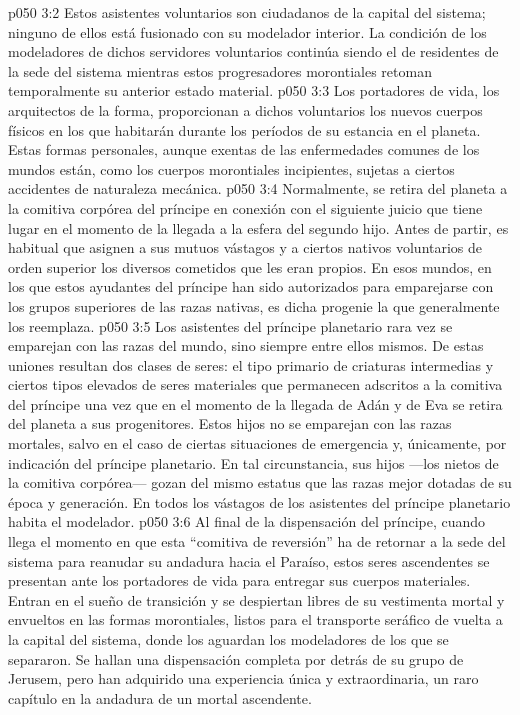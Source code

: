 \vs p050 3:2 \pc Estos asistentes voluntarios son ciudadanos de la capital del sistema; ninguno de ellos está fusionado con su modelador interior. La condición de los modeladores de dichos servidores voluntarios continúa siendo el de residentes de la sede del sistema mientras estos progresadores morontiales retoman temporalmente su anterior estado material.
\vs p050 3:3 Los portadores de vida, los arquitectos de la forma, proporcionan a dichos voluntarios los nuevos cuerpos físicos en los que habitarán durante los períodos de su estancia en el planeta. Estas formas personales, aunque exentas de las enfermedades comunes de los mundos están, como los cuerpos morontiales incipientes, sujetas a ciertos accidentes de naturaleza mecánica.
\vs p050 3:4 \pc Normalmente, se retira del planeta a la comitiva corpórea del príncipe en conexión con el siguiente juicio que tiene lugar en el momento de la llegada a la esfera del segundo hijo. Antes de partir, es habitual que asignen a sus mutuos vástagos y a ciertos nativos voluntarios de orden superior los diversos cometidos que les eran propios. En esos mundos, en los que estos ayudantes del príncipe han sido autorizados para emparejarse con los grupos superiores de las razas nativas, es dicha progenie la que generalmente los reemplaza.
\vs p050 3:5 Los asistentes del príncipe planetario rara vez se emparejan con las razas del mundo, sino siempre entre ellos mismos. De estas uniones resultan dos clases de seres: el tipo primario de criaturas intermedias y ciertos tipos elevados de seres materiales que permanecen adscritos a la comitiva del príncipe una vez que en el momento de la llegada de Adán y de Eva se retira del planeta a sus progenitores. Estos hijos no se emparejan con las razas mortales, salvo en el caso de ciertas situaciones de emergencia y, únicamente, por indicación del príncipe planetario. En tal circunstancia, sus hijos ---los nietos de la comitiva corpórea--- gozan del mismo estatus que las razas mejor dotadas de su época y generación. En todos los vástagos de los asistentes del príncipe planetario habita el modelador.
\vs p050 3:6 Al final de la dispensación del príncipe, cuando llega el momento en que esta “comitiva de reversión” ha de retornar a la sede del sistema para reanudar su andadura hacia el Paraíso, estos seres ascendentes se presentan ante los portadores de vida para entregar sus cuerpos materiales. Entran en el sueño de transición y se despiertan libres de su vestimenta mortal y envueltos en las formas morontiales, listos para el transporte seráfico de vuelta a la capital del sistema, donde los aguardan los modeladores de los que se separaron. Se hallan una dispensación completa por detrás de su grupo de Jerusem, pero han adquirido una experiencia única y extraordinaria, un raro capítulo en la andadura de un mortal ascendente.
